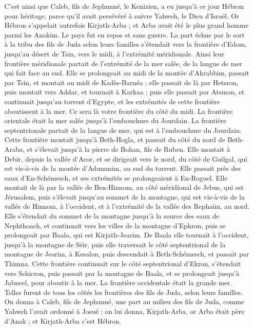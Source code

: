 \begin{multicols}{2}
C’est ainsi que Caleb, fils de Jephunné, le Kenizien, a eu jusqu’à ce jour Hébron pour héritage, parce qu’il avait persévéré à suivre Yahweh, le Dieu d’Israël.
Or Hébron s’appelait autrefois Kirjath-Arba ; et Arba avait été le plus grand homme parmi les Anakim. Le pays fut en repos et sans guerre.
\VerseOne{}La part échue par le sort à la tribu des fils de Juda selon leurs familles s’étendait vers la frontière d’Edom, jusqu’au désert de Tsin, vers le midi, à l’extrémité méridionale.
Ainsi leur frontière méridionale partait de l’extrémité de la mer salée, de la langue de mer qui fait face au sud.
Elle se prolongeait au midi de la montée d’Akrabbim, passait par Tsin, et montait au midi de Kadès-Barnéa ; elle passait de là par Hetsron, puis montait vers Addar, et tournait à Karkaa ;
puis elle passait par Atsmon, et continuait jusqu’au torrent d’Egypte, et les extrémités de cette frontière aboutissent à la mer. Ce sera là votre frontière du côté du midi.
La frontière orientale était la mer salée jusqu’à l’embouchure du Jourdain. La frontière septentrionale partait de la langue de mer, qui est à l’embouchure du Jourdain.
Cette frontière montait jusqu’à Beth-Hogla, et passait du côté du nord de Beth-Araba, et s’élevait jusqu’à la pierre de Bohan, fils de Ruben.
Elle montait à Debir, depuis la vallée d’Acor, et se dirigeait vers le nord, du côté de Guilgal, qui est vis-à-vis de la montée d’Adummim, au sud du torrent. Elle passait près des eaux d’En-Schémesch, et ses extrémités se prolongeaient à En-Roguel.
Elle montait de là par la vallée de Ben-Hinnom, au côté méridional de Jebus, qui est Jérusalem, puis s’élevait jusqu’au sommet de la montagne, qui est vis-à-vis de la vallée de Hinnom, à l’occident, et à l’extrémité de la vallée des Rephaïm, au nord.
Elle s’étendait du sommet de la montagne jusqu’à la source des eaux de Nephthoach, et continuait vers les villes de la montagne d’Ephron, puis se prolongeait par Baala, qui est Kirjath-Jearim.
De Baala elle tournait à l’occident, jusqu’à la montagne de Séir, puis elle traversait le côté septentrional de la montagne de Jearim, à Kesalon, puis descendait à Beth-Schémesch, et passait par Thimna.
Cette frontière continuait sur le côté septentrional d’Ekron, s’étendait vers Schicron, puis passait par la montagne de Baala, et se prolongeait jusqu’à Jabneel, pour aboutir à la mer.
La frontière occidentale était la grande mer. Telles furent de tous les côtés les frontières des fils de Juda, selon leurs familles.
On donna à Caleb, fils de Jephunné, une part au milieu des fils de Juda, comme Yahweh l’avait ordonné à Josué ; on lui donna, Kirjath-Arba, or Arba était père d’Anak ; et Kirjath-Arba c’est Hébron.

\end{multicols}
